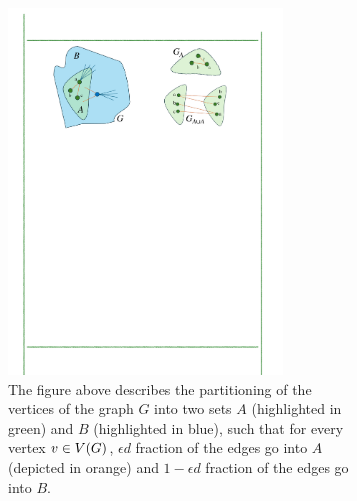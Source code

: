 \documentclass[11pt]{article}
\begin{document}
\begin{figure}[t!]
    \centering
    \begin{subfigure}[t]{0.45\textwidth}
        \centering
        \includegraphics[width=0.8\textwidth]{assets/ParitionA.pdf}
        \caption{The figure above describes the partitioning of the vertices of the graph $G$ into two sets $A$ (highlighted in green) and $B$ (highlighted in blue), such that for every vertex $v \in V(G)$, $\epsilon d$ fraction of the edges go into $A$ (depicted in orange) and $1 - \epsilon d$ fraction of the edges go into $B$.}
        \label{subfig:partitionA}
    \end{subfigure}%
    \hspace{1mm}
    \vrule width 1pt %
    \hspace{1mm}
    \begin{subfigure}[t]{0.45\textwidth}
        \centering

\end{subfigure}
\end{figure}
\end{document}

